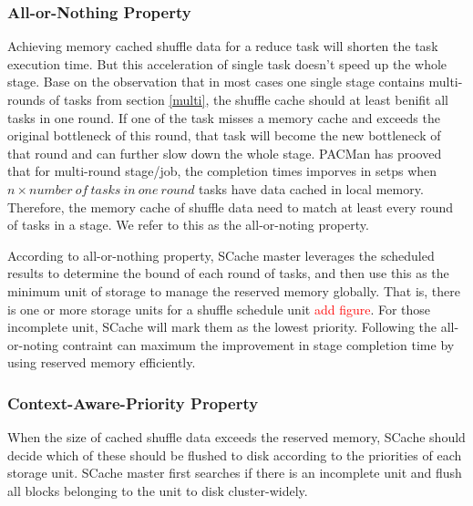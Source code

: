 \subsubsection{All-or-Nothing Property}
Achieving memory cached shuffle data for a reduce task will shorten the task execution time. But this acceleration of single task doesn't speed up the whole stage. Base on the observation that in most cases one single stage contains multi-rounds of tasks from section \ref{multi}, the shuffle cache should at least benifit all tasks in one round. If one of the task misses a memory cache and exceeds the original bottleneck of this round, that task will become the new bottleneck of that round and can further slow down the whole stage. PACMan\cite{pacman} has prooved that for multi-round stage/job, the completion times imporves in setps when $n\times number\ of\ tasks\ in\ one\ round$ tasks have data cached in local memory. Therefore, the memory cache of shuffle data need to match at least every round of tasks in a stage. We refer to this as the all-or-noting property. 

According to all-or-nothing property, SCache master leverages the scheduled results to determine the bound of each round of tasks, and then use this as the minimum unit of storage to manage the reserved memory globally. That is, there is one or more storage units for a shuffle schedule unit \textcolor{red}{add figure}. For those incomplete unit, SCache will mark them as the lowest priority. Following the all-or-noting contraint can maximum the improvement in stage completion time by using reserved memory efficiently.

\subsubsection{Context-Aware-Priority Property}
When the size of cached shuffle data exceeds the reserved memory, SCache should decide which of these should be flushed to disk according to the priorities of each storage unit. SCache master first searches if there is an incomplete unit and flush all blocks belonging to the unit to disk cluster-widely. 

